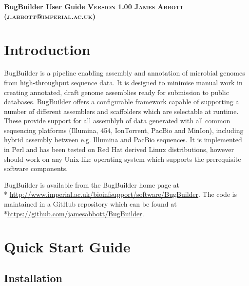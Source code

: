 \documentclass[a4paper,10pt]{article}
\begin{document}
\begin{titlepage}
\begin{center}
  \bfseries
  \huge BugBuilder User Guide
  \vskip 0.1in
  \textsc{\normalsize Version 1.00 }
  \vskip 0.1in
  \textsc{\normalsize James Abbott (j.abbott@imperial.ac.uk)}
\end{center}

\tableofcontents
\renewcommand{\baselinestretch}{1.0}\normalsize
\end{titlepage}
\newpage
\graphicspath{ {images/} }

\section{Introduction}

BugBuilder is a pipeline enabling assembly and annotation of microbial genomes
from high-throughput sequence data. It is designed to minimise manual work in
creating annotated, draft genome assemblies ready for submission to public
databases.  BugBuilder offers a configurable framework capable of supporting a
number of different assemblers and scaffolders which are selectable at runtime.
These provide support for all assemblyh of data generated with all common
sequencing platforms (Illumina, 454, IonTorrent, PacBio and MinIon), including
hybrid assembly between e.g. Illumina and PacBio sequences.  It is implemented
in Perl and has been tested on Red Hat derived Linux distributions, however
should work on any Unix-like operating system which supports the prerequisite
software components.


BugBuilder is available from the BugBuilder home page at\\*
\url{http://www.imperial.ac.uk/bioinfsupport/software/BugBuilder}. The code is
maintained in a GitHub repository which can be found at
\\*\url{https://github.com/jamesabbott/BugBuilder}.  

\section{Quick Start Guide}

\subsection{Installation}
\end{document}
